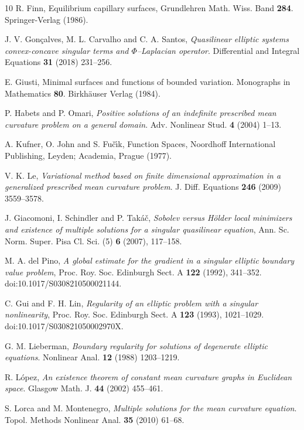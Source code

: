 \documentclass[11pt,leqno]{amsart}
\begin{document}
\begin{thebibliography}{10}
 R. Finn, Equilibrium capillary surfaces, Grundlehren Math. Wiss. Band \textbf{284}. Springer-Verlag (1986).

 J. V. Gon\c{c}alves, M. L. Carvalho and C. A. Santos, {\em Quasilinear elliptic systems convex-concave singular terms and $\Phi$--Laplacian operator}. Differential and Integral Equations \textbf{31} (2018) 231--256.


 E. Giusti, Minimal surfaces and functions of bounded variation. Monographs in Mathematics \textbf{80}. Birkh\"auser Verlag (1984).


 P. Habets and P. Omari, {\em Positive solutions of an indefinite prescribed mean curvature problem on a general domain}. Adv. Nonlinear Stud. \textbf{4} (2004) 1--13.
	
 A. Kufner, O. John and S. Fu\v{c}\'{\i}k, Function Spaces, Noordhoff International Publishing, Leyden; Academia, Prague (1977).

 V. K. Le, {\em Variational method based on finite dimensional approximation in a generalized prescribed mean curvature problem}. J. Diff. Equations \textbf{246} (2009) 3559--3578.

	
J. Giacomoni, I. Schindler and P. Tak\'a\v{c},
{\em Sobolev versus H\"older local minimizers and existence of
multiple solutions for a singular quasilinear equation},
Ann. Sc. Norm. Super. Pisa Cl. Sci. (5) \textbf{6} (2007), 117--158.

M. A. del Pino,
{\em A global estimate for the gradient in a singular elliptic boundary
value problem},
Proc. Roy. Soc. Edinburgh Sect. A \textbf{122} (1992), 341--352.
doi:10.1017/S0308210500021144.

C. Gui and F. H. Lin,
{\em Regularity of an elliptic problem with a singular nonlinearity},
Proc. Roy. Soc. Edinburgh Sect. A \textbf{123} (1993), 1021--1029.
doi:10.1017/S030821050002970X.

 G. M. Lieberman, {\em Boundary regularity for solutions of degenerate elliptic equations}. Nonlinear Anal. \textbf{12} (1988) 1203--1219.

  R. L\'opez, {\em An existence theorem of constant mean curvature graphs in Euclidean space}. Glasgow Math. J. \textbf{44} (2002) 455--461.

  S. Lorca and M. Montenegro,  {\em Multiple solutions for the mean curvature equation}. Topol. Methods Nonlinear Anal. \textbf{35} (2010) 61--68.


\end{thebibliography}
\end{document}
